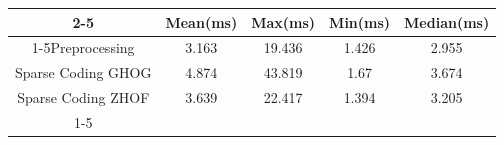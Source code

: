 \documentclass{standalone}
\begin{document}
 
 \begin{tabular}{|c |c |c |c |c |}
\cline{2-5}\cline{2-5} \multicolumn{1}{c |}{ } & Mean(ms) & Max(ms) & Min(ms) & Median(ms)\\ 
\cline{1-5}Preprocessing & 3.163 & 19.436 & 1.426 & 2.955\\ 
 \hhline{|=|=|=|=|=|}Sparse Coding GHOG & 4.874 & 43.819 & 1.67 & 3.674\\ 
 \hhline{|=|=|=|=|=|}Sparse Coding ZHOF & 3.639 & 22.417 & 1.394 & 3.205\\ 
 \cline{1-5}\hline \end{tabular}
 
\end{document}
